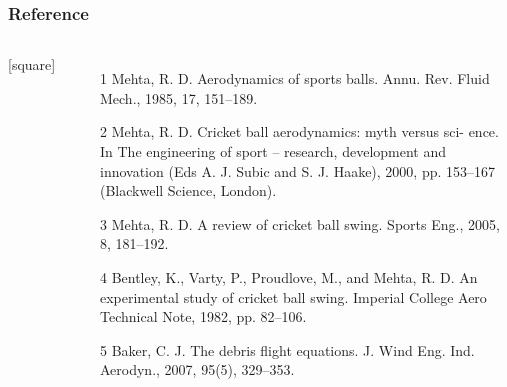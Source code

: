 \documentclass{beamer}
\begin{document}
\begin{frame}
\frametitle{Reference}
\begin{columns}
  
[square]
  \begin{itemize}
  \item [1]Mehta, R. D. Aerodynamics of sports balls. Annu. Rev.
Fluid Mech., 1985, 17, 151–189.
  \item [2]Mehta, R. D. Cricket ball aerodynamics: myth versus sci-
ence. In The engineering of sport – research, development
and innovation (Eds A. J. Subic and S. J. Haake), 2000,
pp. 153–167 (Blackwell Science, London).
  \item [3]Mehta, R. D. A review of cricket ball swing. Sports Eng.,
2005, 8, 181–192.
  \item [4]Bentley, K., Varty, P., Proudlove, M., and Mehta, R. D. An
experimental study of cricket ball swing. Imperial College
Aero Technical Note, 1982, pp. 82–106.
  \item [5] Baker, C. J. The debris flight equations. J. Wind Eng. Ind.
Aerodyn., 2007, 95(5), 329–353.
  \end{itemize}

\end{columns}

\end{frame}


\newpage

\end{document}
